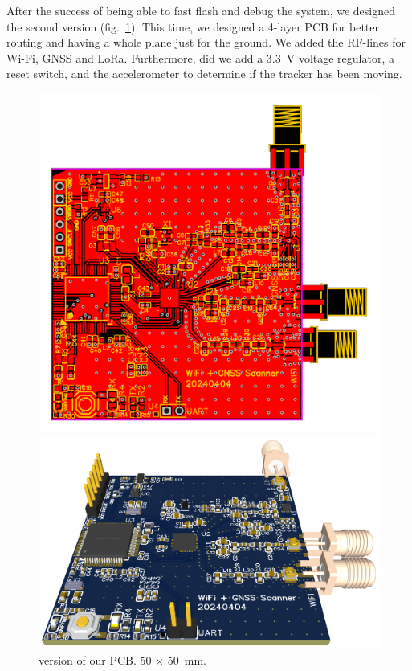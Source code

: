 After the success of being able to fast flash and debug the system, we designed the second version (fig.~\ref{fig:pcb_v2}). This time, we designed a 4-layer \ac{PCB} for better routing and having a whole plane just for the ground. We added the \ac{RF}-lines for Wi-Fi, \ac{GNSS} and \ac{LoRa}. Furthermore, did we add a \SI{3.3}{\volt} voltage regulator, a reset switch, and the accelerometer to determine if the tracker has been moving.

\begin{figure}[H]
    \centering
    \begin{minipage}[c]{0.49\textwidth}
        \centering
        \includegraphics[width=\textwidth]{figures/PCB_v2.png}
    \end{minipage}
    \hfill
    \begin{minipage}[c]{0.49\textwidth}
        \centering
        \includegraphics[width=\textwidth]{figures/PCB_v2_3D.png}
    \end{minipage}
    \caption{ version of our PCB. \si{50} $\times$ \SI{50}{\milli\meter}.}
    \label{fig:pcb_v2}
\end{figure}

